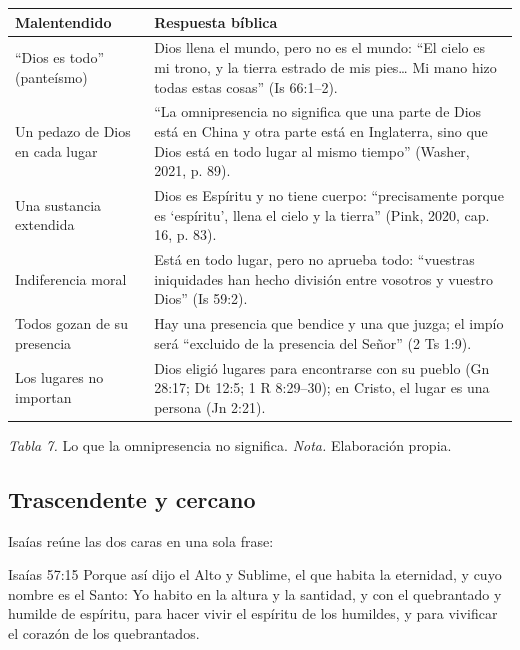 \begin{center}\small\renewcommand{\arraystretch}{1.22}
\begin{tabular}{@{}L{4.0cm}L{10.0cm}@{}}
\toprule
\textbf{Malentendido} & \textbf{Respuesta bíblica} \\ \midrule
``Dios es todo'' (panteísmo) & Dios llena el mundo, pero no es el mundo: ``El cielo es mi trono, y la tierra estrado de mis pies\ldots{} Mi mano hizo todas estas cosas'' (Is 66:1--2). \\
Un pedazo de Dios en cada lugar & ``La omnipresencia no significa que una parte de Dios está en China y otra parte está en Inglaterra, sino que Dios está en todo lugar al mismo tiempo'' (Washer, 2021, p. 89). \\
Una sustancia extendida & Dios es Espíritu y no tiene cuerpo: ``precisamente porque es `espíritu', llena el cielo y la tierra'' (Pink, 2020, cap. 16, p. 83). \\
Indiferencia moral & Está en todo lugar, pero no aprueba todo: ``vuestras iniquidades han hecho división entre vosotros y vuestro Dios'' (Is 59:2). \\
Todos gozan de su presencia & Hay una presencia que bendice y una que juzga; el impío será ``excluido de la presencia del Señor'' (2 Ts 1:9). \\
Los lugares no importan & Dios eligió lugares para encontrarse con su pueblo (Gn 28:17; Dt 12:5; 1 R 8:29--30); en Cristo, el lugar es una persona (Jn 2:21). \\
\bottomrule
\end{tabular}\par
{\footnotesize\color{gris}\textit{Tabla 7.} Lo que la omnipresencia no significa. \textit{Nota.} Elaboración propia.}
\end{center}

\subsection{Trascendente y cercano}

Isaías reúne las dos caras en una sola frase:

\begin{verso}{Isaías 57:15}
Porque así dijo el Alto y Sublime, el que habita la eternidad, y cuyo nombre es el Santo: Yo habito en la altura y la santidad, y con el quebrantado y humilde de espíritu, para hacer vivir el espíritu de los humildes, y para vivificar el corazón de los quebrantados.
\end{verso}

